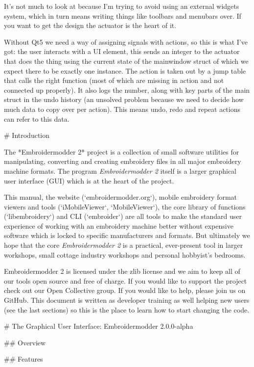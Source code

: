 It's not much to look at because I'm trying to avoid using an external
widgets system, which in turn means writing things like toolbars and menubars
over. If you want to get the design the actuator is the heart of it.

Without Qt5 we need a way of assigning signals with actions, so this is what
I've got: the user interacts with a UI element, this sends an integer to the
actuator that does the thing using the current state of the mainwindow struct
of which we expect there to be exactly one instance. The action is taken out
by a jump table that calls the right function (most of which are missing in
action and not connected up properly). It also logs the number, along with
key parts of the main struct in the undo history (an unsolved problem because
we need to decide how much data to copy over per action). This means undo,
redo and repeat actions can refer to this data.


# Introduction

The *Embroidermodder 2* project is a collection of small software utilities for
manipulating, converting and creating embroidery files in all major embroidery
machine formats. The program \textit{Embroidermodder 2} itself is a larger graphical
user interface (GUI) which is at the heart of the project.

This manual, the website (`embroidermodder.org`), mobile embroidery format viewers
and tools (`iMobileViewer`, `MobileViewer`), the core library of functions
(`libembroidery`) and CLI (`embroider`) are all tools to make the standard
user experience of working with an embroidery machine better without expensive
software which is locked to specific manufacturers and formats. But ultimately
we hope that the core \textit{Embroidermodder 2} is a practical, ever-present tool in
larger workshops, small cottage industry workshops and personal hobbyist's
bedrooms.

Embroidermodder 2 is licensed under the zlib license and we aim to keep all of
our tools open source and free of charge. If you would like to support the
project check out our Open Collective group. If you would like to help, please
join us on GitHub. This document is written as developer training as well
helping new users (see the last sections) so this is the place to learn how
to start changing the code.

# The Graphical User Interface: Embroidermodder 2.0.0-alpha

## Overview

## Features

